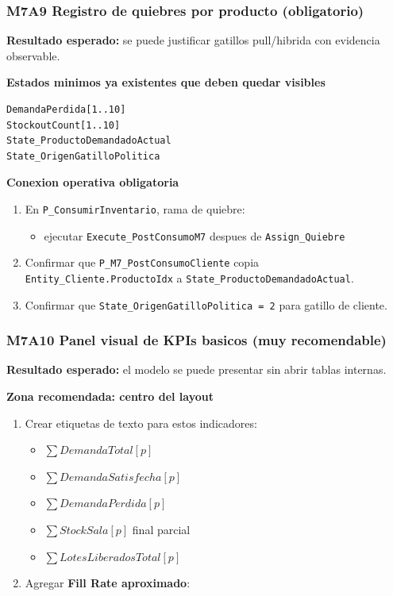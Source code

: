 \documentclass[11pt]{article}
\newcommand{\simio}[1]{\texttt{#1}}
\newcommand{\state}[1]{\texttt{#1}}
\newcommand{\proc}[1]{\texttt{#1}}
\begin{document}
\subsubsection{M7A9 Registro de quiebres por producto (obligatorio)}
\textbf{Resultado esperado:} se puede justificar gatillos pull/hibrida con evidencia observable.

\textbf{Estados minimos ya existentes que deben quedar visibles}
\begin{lstlisting}[caption={Estados minimos de quiebre a exponer en M7A}]
DemandaPerdida[1..10]
StockoutCount[1..10]
State_ProductoDemandadoActual
State_OrigenGatilloPolitica
\end{lstlisting}

\textbf{Conexion operativa obligatoria}
\begin{enumerate}
  \item En \proc{P\_ConsumirInventario}, rama de quiebre:
  \begin{itemize}
    \item ejecutar \simio{Execute\_PostConsumoM7} despues de \simio{Assign\_Quiebre}
  \end{itemize}
  \item Confirmar que \proc{P\_M7\_PostConsumoCliente} copia \state{Entity\_Cliente.ProductoIdx} a \state{State\_ProductoDemandadoActual}.
  \item Confirmar que \state{State\_OrigenGatilloPolitica = 2} para gatillo de cliente.
\end{enumerate}

\subsubsection{M7A10 Panel visual de KPIs basicos (muy recomendable)}
\textbf{Resultado esperado:} el modelo se puede presentar sin abrir tablas internas.

\textbf{Zona recomendada: centro del layout}
\begin{enumerate}
  \item Crear etiquetas de texto para estos indicadores:
  \begin{itemize}
    \item \(\sum DemandaTotal[p]\)
    \item \(\sum DemandaSatisfecha[p]\)
    \item \(\sum DemandaPerdida[p]\)
    \item \(\sum StockSala[p]\) final parcial
    \item \(\sum LotesLiberadosTotal[p]\)
  \end{itemize}
  \item Agregar \textbf{Fill Rate aproximado}:
\end{enumerate}
\end{document}
